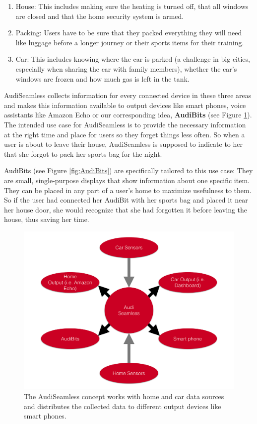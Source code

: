 \begin{enumerate}
    \item House: This includes making sure the heating is turned off, that all windows are closed and that the home security system is armed.
    \item Packing: Users have to be sure that they packed everything they will need like luggage before a longer journey or their sports items for their training.
    \item Car: This includes knowing where the car is parked (a challenge in big cities, especially when sharing the car with family members), whether the car's windows are frozen and how much gas is left in the tank.
\end{enumerate}

\noindent{}AudiSeamless collects information for every connected device in these three areas and makes this information available to output devices like smart phones, voice assistants like Amazon Echo or our corresponding idea, \textbf{AudiBits} (see Figure \ref{fig:AudiSeamless}). The intended use case for AudiSeamless is to provide the necessary information at the right time and place for users so they forget things less often. So when a user is about to leave their house, AudiSeamless is supposed to indicate to her that she forgot to pack her sports bag for the night.

AudiBits (see Figure \ref{fig:AudiBits}) are specifically tailored to this use case: They are small, single-purpose displays that show information about one specific item. They can be placed in any part of a user's home to maximize usefulness to them. So if the user had connected her AudiBit with her sports bag and placed it near her house door, she would recognize that she had forgotten it before leaving the house, thus saving her time.

\begin{figure}[ht]
\centering
	\includegraphics[keepaspectratio, width=\textwidth]{Figures/Specifications/AudiSeamless}
	\caption{The AudiSeamless concept works with home and car data sources and distributes the collected data to different output devices like smart phones.}
	\label{fig:AudiSeamless}
\end{figure}

